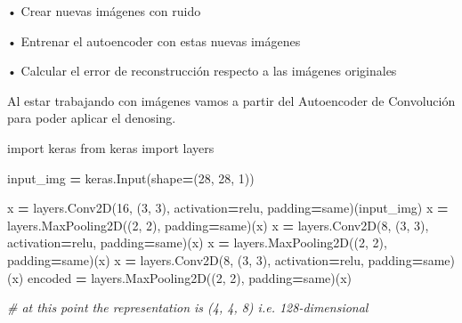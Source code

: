 \documentclass[
  a4paper,
  DIV=11,
  numbers=noendperiod]{scrreprt}
\newenvironment{Shaded}{\begin{snugshade}}{\end{snugshade}}
\newcommand{\CommentTok}[1]{\textcolor[rgb]{0.56,0.35,0.01}{\textit{#1}}}
\newcommand{\DecValTok}[1]{\textcolor[rgb]{0.00,0.00,0.81}{#1}}
\newcommand{\ImportTok}[1]{#1}
\newcommand{\NormalTok}[1]{#1}
\newcommand{\OperatorTok}[1]{\textcolor[rgb]{0.81,0.36,0.00}{\textbf{#1}}}
\newcommand{\StringTok}[1]{\textcolor[rgb]{0.31,0.60,0.02}{#1}}
\begin{document}
• Crear nuevas imágenes con ruido

• Entrenar el autoencoder con estas nuevas imágenes

• Calcular el error de reconstrucción respecto a las imágenes originales

Al estar trabajando con imágenes vamos a partir del Autoencoder de
Convolución para poder aplicar el denosing.

\begin{Shaded}
\begin{Highlighting}[numbers=left,,]
\ImportTok{import}\NormalTok{ keras}
\ImportTok{from}\NormalTok{ keras }\ImportTok{import}\NormalTok{ layers}

\NormalTok{input\_img }\OperatorTok{=}\NormalTok{ keras.Input(shape}\OperatorTok{=}\NormalTok{(}\DecValTok{28}\NormalTok{, }\DecValTok{28}\NormalTok{, }\DecValTok{1}\NormalTok{))}

\NormalTok{x }\OperatorTok{=}\NormalTok{ layers.Conv2D(}\DecValTok{16}\NormalTok{, (}\DecValTok{3}\NormalTok{, }\DecValTok{3}\NormalTok{), activation}\OperatorTok{=}\StringTok{\textquotesingle{}relu\textquotesingle{}}\NormalTok{, padding}\OperatorTok{=}\StringTok{\textquotesingle{}same\textquotesingle{}}\NormalTok{)(input\_img)}
\NormalTok{x }\OperatorTok{=}\NormalTok{ layers.MaxPooling2D((}\DecValTok{2}\NormalTok{, }\DecValTok{2}\NormalTok{), padding}\OperatorTok{=}\StringTok{\textquotesingle{}same\textquotesingle{}}\NormalTok{)(x)}
\NormalTok{x }\OperatorTok{=}\NormalTok{ layers.Conv2D(}\DecValTok{8}\NormalTok{, (}\DecValTok{3}\NormalTok{, }\DecValTok{3}\NormalTok{), activation}\OperatorTok{=}\StringTok{\textquotesingle{}relu\textquotesingle{}}\NormalTok{, padding}\OperatorTok{=}\StringTok{\textquotesingle{}same\textquotesingle{}}\NormalTok{)(x)}
\NormalTok{x }\OperatorTok{=}\NormalTok{ layers.MaxPooling2D((}\DecValTok{2}\NormalTok{, }\DecValTok{2}\NormalTok{), padding}\OperatorTok{=}\StringTok{\textquotesingle{}same\textquotesingle{}}\NormalTok{)(x)}
\NormalTok{x }\OperatorTok{=}\NormalTok{ layers.Conv2D(}\DecValTok{8}\NormalTok{, (}\DecValTok{3}\NormalTok{, }\DecValTok{3}\NormalTok{), activation}\OperatorTok{=}\StringTok{\textquotesingle{}relu\textquotesingle{}}\NormalTok{, padding}\OperatorTok{=}\StringTok{\textquotesingle{}same\textquotesingle{}}\NormalTok{)(x)}
\NormalTok{encoded }\OperatorTok{=}\NormalTok{ layers.MaxPooling2D((}\DecValTok{2}\NormalTok{, }\DecValTok{2}\NormalTok{), padding}\OperatorTok{=}\StringTok{\textquotesingle{}same\textquotesingle{}}\NormalTok{)(x)}

\CommentTok{\# at this point the representation is (4, 4, 8) i.e. 128{-}dimensional}


\end{Highlighting}
\end{Shaded}
\end{document}
